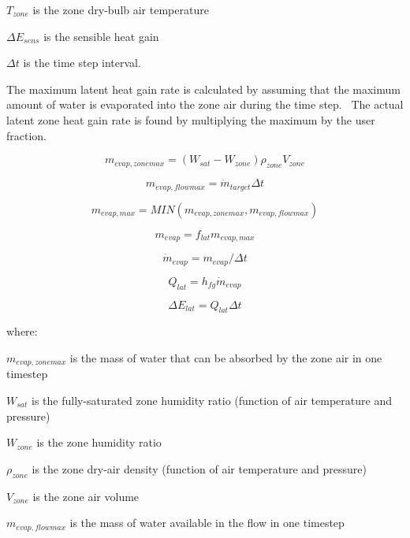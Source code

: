 \({T_{zone}}\) is the zone dry-bulb air temperature

\(\Delta {E_{sens}}\) is the sensible heat gain

\(\Delta t\) is the time step interval.

The maximum latent heat gain rate is calculated by assuming that the maximum amount of water is evaporated into the zone air during the time step.~ The actual latent zone heat gain rate is found by multiplying the maximum by the user fraction.

\begin{equation}
{m_{evap,zonemax}} = \left( {{W_{sat}} - {W_{zone}}} \right){\rho_{zone}}{V_{zone}}
\end{equation}

\begin{equation}
{m_{evap,flowmax}} = {\dot m_{target}}\Delta t
\end{equation}

\begin{equation}
{m_{evap,max}} = MIN({m_{evap,zonemax}},{m_{evap,flowmax}})
\end{equation}

\begin{equation}
{m_{evap}} = {f_{lat}}{m_{evap,max}}
\end{equation}

\begin{equation}
{\dot m_{evap}} = {m_{evap}}/\Delta t
\end{equation}

\begin{equation}
{Q_{lat}} = {h_{fg}}{\dot m_{evap}}
\end{equation}

\begin{equation}
\Delta {E_{lat}} = {Q_{lat}}\Delta t
\end{equation}

where:

\({m_{evap,zonemax}}\) is the mass of water that can be absorbed by the zone air in one timestep

\({W_{sat}}\) is the fully-saturated zone humidity ratio (function of air temperature and pressure)

\({W_{zone}}\) is the zone humidity ratio

\({\rho_{zone}}\) is the zone dry-air density (function of air temperature and pressure)

\({V_{zone}}\) is the zone air volume

\({m_{evap,flowmax}}\) is the mass of water available in the flow in one timestep

